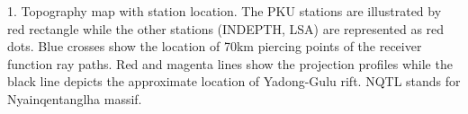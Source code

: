 1. Topography map with station location. The PKU stations are illustrated by red rectangle while the other stations (INDEPTH, LSA) are represented as red dots. Blue crosses show the location of 70km piercing points of the receiver function ray paths. Red and magenta lines show the projection profiles while the black line depicts the approximate location of Yadong-Gulu rift. NQTL stands for Nyainqentanglha massif.